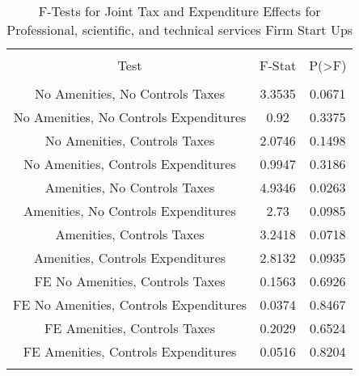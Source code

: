 
\begin{table}[!htbp] \centering 
  \caption{F-Tests for Joint Tax and Expenditure Effects for Professional, scientific, and technical services Firm Start Ups} 
  \label{54Ftests} 
\begin{tabular}{@{\extracolsep{5pt}} ccc} 
\\[-1.8ex]\hline 
\hline \\[-1.8ex] 
Test & F-Stat & P(\textgreater F) \\ 
\hline \\[-1.8ex] 
No Amenities, No Controls Taxes & 3.3535 & 0.0671 \\ 
No Amenities, No Controls Expenditures & 0.92 & 0.3375 \\ 
No Amenities, Controls Taxes & 2.0746 & 0.1498 \\ 
No Amenities, Controls Expenditures & 0.9947 & 0.3186 \\ 
Amenities, No Controls Taxes & 4.9346 & 0.0263 \\ 
Amenities, No Controls Expenditures & 2.73 & 0.0985 \\ 
Amenities, Controls Taxes & 3.2418 & 0.0718 \\ 
Amenities, Controls Expenditures & 2.8132 & 0.0935 \\ 
FE No Amenities, Controls Taxes & 0.1563 & 0.6926 \\ 
FE No Amenities, Controls Expenditures & 0.0374 & 0.8467 \\ 
FE Amenities, Controls Taxes & 0.2029 & 0.6524 \\ 
FE Amenities, Controls Expenditures & 0.0516 & 0.8204 \\ 
\hline \\[-1.8ex] 
\end{tabular} 
\end{table} 
